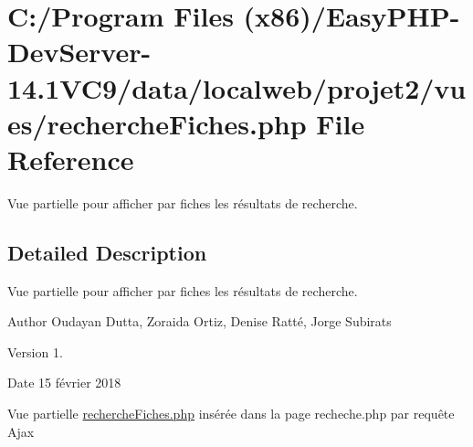 \hypertarget{recherche_fiches_8php}{}\section{C\+:/\+Program Files (x86)/\+Easy\+P\+H\+P-\/\+Dev\+Server-\/14.1\+V\+C9/data/localweb/projet2/vues/recherche\+Fiches.php File Reference}
\label{recherche_fiches_8php}


Vue partielle pour afficher par fiches les résultats de recherche.  




\subsection{Detailed Description}
Vue partielle pour afficher par fiches les résultats de recherche. 

\begin{DoxyAuthor}{Author}
Oudayan Dutta, Zoraida Ortiz, Denise Ratté, Jorge Subirats 
\end{DoxyAuthor}
\begin{DoxyVersion}{Version}
1. 
\end{DoxyVersion}
\begin{DoxyDate}{Date}
15 février 2018
\end{DoxyDate}
Vue partielle \hyperlink{recherche_fiches_8php}{recherche\+Fiches.\+php} insérée dans la page recheche.\+php par requête Ajax 